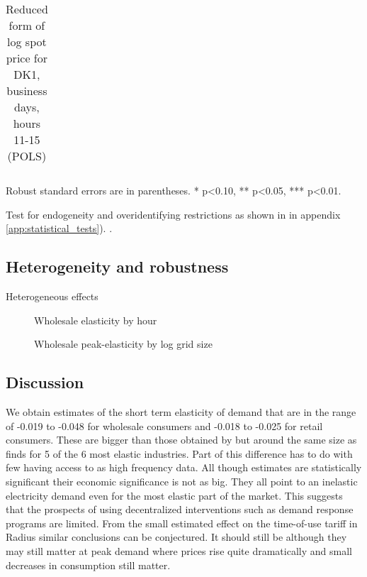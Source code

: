\begin{table}[H]
\begin{threeparttable}
  \centering
  \caption{Reduced form of log spot price for DK1, business days, hours 11-15 (POLS)}
  \label{tab:reduced_form_price_dk1}
  \footnotesize
  \begin{tabular}{lcccc}
         
  \end{tabular}
    \begin{tablenotes}
        \item Robust standard errors are in parentheses. * p<0.10, ** p<0.05, *** p<0.01.
    \end{tablenotes}
\end{threeparttable}
\end{table}

Test for endogeneity and overidentifying restrictions as shown in in appendix \ref{app:statistical_tests}). \citep{statacorp2017stata}.
\medskip\\


\subsection{Heterogeneity and robustness}
\label{subsec:r_robustness}


Heterogeneous effects
\begin{figure}[H]
  \centering
  \caption{Wholesale elasticity by hour}
  \label{fig:ws_elasticity_hour}
\end{figure}

\begin{figure}[H]
  \centering
  \caption{Wholesale peak-elasticity by log grid size}
  \label{fig:ws_elasticity_grid}
\end{figure}


\subsection{Discussion}
\label{subsec:r_discussion}
We obtain estimates of the short term elasticity of demand that are in the range of -0.019 to -0.048 for wholesale consumers and -0.018 to -0.025 for retail consumers. These are bigger than those obtained by \cite{lijesen2007real} but around the same size as \cite{wolak2001impact} finds for 5 of the 6 most elastic industries. Part of this difference has to do with few having access to as high frequency data.  %
All though estimates are statistically significant their economic significance is not as big. They all point to an inelastic electricity demand even for the most elastic part of the market. This suggests that the prospects of using decentralized interventions such as demand response programs are limited. From the small estimated effect on the time-of-use tariff in Radius similar conclusions can be conjectured. It should still be although they may still matter at peak demand where prices rise quite dramatically and small decreases in consumption still matter.
\smallskip \\

